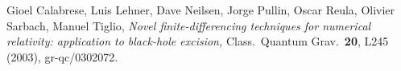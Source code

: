 \documentclass{article}
\begin{document}
\begin{thebibliography}{9}
Gioel Calabrese, Luis Lehner, Dave Neilsen, Jorge Pullin, Oscar Reula,
Olivier Sarbach, Manuel Tiglio, \textit{Novel finite-differencing
techniques for numerical relativity: application to black-hole
excision,} Class.\ Quantum Grav.\ \textbf{20}, L245 (2003),
gr-qc/0302072.
\end{thebibliography}

\end{document}
